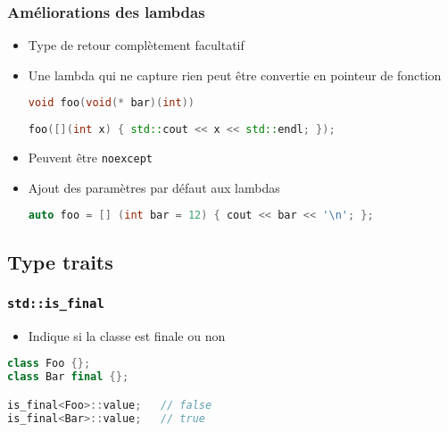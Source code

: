 \documentclass[C++.tex]{subfiles}
\begin{document}
\begin{frame}[fragile]
	\frametitle{Améliorations des lambdas}
	\begin{itemize}
		\item Type de retour complètement facultatif


		\item Une lambda qui ne capture rien peut être convertie en pointeur de fonction


\begin{lstlisting}[language=C++]
void foo(void(* bar)(int))
		
foo([](int x) { std::cout << x << std::endl; });\end{lstlisting}

		\item Peuvent être \lstinline|noexcept|
		\item Ajout des paramètres par défaut aux lambdas
	
		\begin{lstlisting}[language=C++]
auto foo = [] (int bar = 12) { cout << bar << '\n'; };\end{lstlisting}
	\end{itemize}
\end{frame}

\subsection*{Type traits}
\begin{frame}[fragile]
	\frametitle{\lstinline|std::is_final|}
	\begin{itemize}
		\item Indique si la classe est finale ou non
	\end{itemize}

	\begin{lstlisting}[language=C++]
class Foo {};
class Bar final {};

is_final<Foo>::value;   // false
is_final<Bar>::value;   // true\end{lstlisting}
\end{frame}
\end{document}
